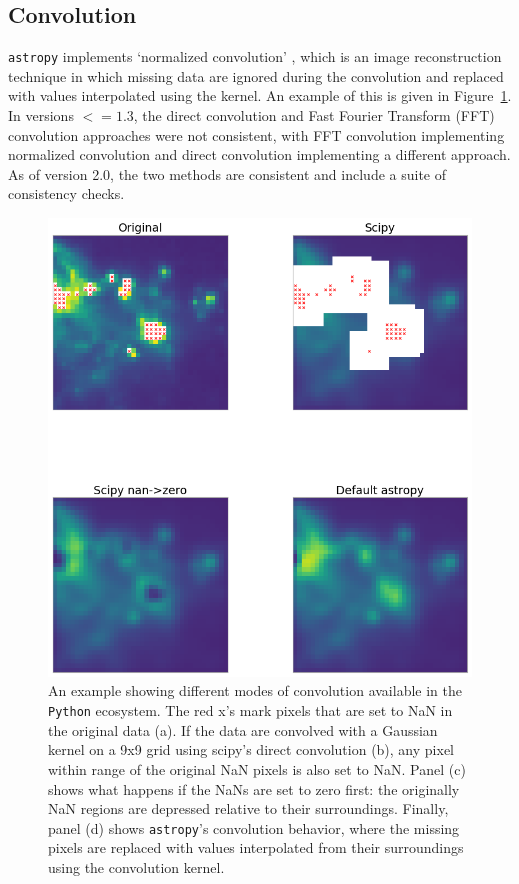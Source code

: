 \documentclass[modern]{aastex61}
\newcommand{\package}[1]{\texttt{#1}\xspace}
\newcommand{\python}{\package{Python}}
\newcommand{\astropypkg}{\package{astropy}}
\renewcommand{\figurename}{Figure\xspace}
\begin{document}
\subsection{Convolution}

\astropypkg implements `normalized convolution' \citep[e.g.,][]{Knutsson1993}, which is an image reconstruction technique in which missing data are ignored during the convolution and replaced with values interpolated using the kernel.   An example of this is given in \figurename~\ref{fig:convolution-example}.  In versions $<=1.3$, the direct convolution and Fast Fourier Transform (FFT) convolution approaches were not consistent, with FFT convolution implementing normalized convolution and direct convolution implementing a different approach.  As of version 2.0, the two methods are consistent and include a suite of consistency checks.

\begin{figure}
\includegraphics[width=\textwidth]{convolution_example.png}
\caption{%
    An example showing different modes of convolution available in the \python
    ecosystem.  The red x's mark pixels that are set to NaN in the original data
    (a).  If the data are convolved with a Gaussian kernel on a 9x9 grid using
    scipy's direct convolution (b), any pixel within range of the original NaN
    pixels is also set to NaN.  Panel (c) shows what happens if the NaNs are set
    to zero first: the originally NaN regions are depressed relative to their
    surroundings.  Finally, panel (d) shows \astropypkg's convolution behavior,
    where the missing pixels are replaced with values interpolated from their
    surroundings using the convolution kernel.
    \label{fig:convolution-example}
}
\end{figure}
\end{document}
